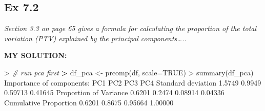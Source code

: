 \documentclass[
]{article}
\newenvironment{Shaded}{\begin{snugshade}}{\end{snugshade}}
\newcommand{\AttributeTok}[1]{\textcolor[rgb]{0.77,0.63,0.00}{#1}}
\newcommand{\CommentTok}[1]{\textcolor[rgb]{0.56,0.35,0.01}{\textit{#1}}}
\newcommand{\ConstantTok}[1]{\textcolor[rgb]{0.00,0.00,0.00}{#1}}
\newcommand{\DecValTok}[1]{\textcolor[rgb]{0.00,0.00,0.81}{#1}}
\newcommand{\ErrorTok}[1]{\textcolor[rgb]{0.64,0.00,0.00}{\textbf{#1}}}
\newcommand{\FloatTok}[1]{\textcolor[rgb]{0.00,0.00,0.81}{#1}}
\newcommand{\FunctionTok}[1]{\textcolor[rgb]{0.00,0.00,0.00}{#1}}
\newcommand{\NormalTok}[1]{#1}
\newcommand{\OtherTok}[1]{\textcolor[rgb]{0.56,0.35,0.01}{#1}}
\newcommand{\SpecialCharTok}[1]{\textcolor[rgb]{0.00,0.00,0.00}{#1}}
\begin{document}
\hypertarget{ex-7.2}{%
\subsection{Ex 7.2}\label{ex-7.2}}

\emph{Section 3.3 on page 65 gives a formula for calculating the
proportion of the total variation (PTV) explained by the principal
components\ldots..}

\textbf{MY SOLUTION:}

\begin{Shaded}
\begin{Highlighting}[]
\SpecialCharTok{\textgreater{}} \CommentTok{\# run pca first}
\ErrorTok{\textgreater{}}\NormalTok{ df\_pca }\OtherTok{\textless{}{-}} \FunctionTok{prcomp}\NormalTok{(df, }\AttributeTok{scale=}\ConstantTok{TRUE}\NormalTok{)}
\SpecialCharTok{\textgreater{}} \FunctionTok{summary}\NormalTok{(df\_pca)}
\NormalTok{Importance of components}\SpecialCharTok{:}
\NormalTok{                          PC1    PC2     PC3     PC4}
\NormalTok{Standard deviation     }\FloatTok{1.5749} \FloatTok{0.9949} \FloatTok{0.59713} \FloatTok{0.41645}
\NormalTok{Proportion of Variance }\FloatTok{0.6201} \FloatTok{0.2474} \FloatTok{0.08914} \FloatTok{0.04336}
\NormalTok{Cumulative Proportion  }\FloatTok{0.6201} \FloatTok{0.8675} \FloatTok{0.95664} \FloatTok{1.00000}
\end{Highlighting}
\end{Shaded}

\begin{Shaded}
\end{Shaded}
\end{document}
